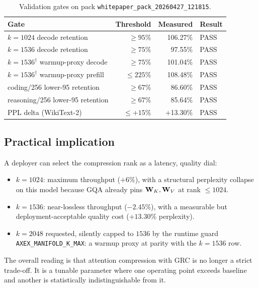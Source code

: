 \documentclass[11pt]{article}
\begin{document}
\begin{table}[h]\centering\footnotesize
\caption{Validation gates on pack \texttt{whitepaper\_pack\_20260427\_121815}.}
\begin{tabular}{@{}lrrl@{}}
\toprule
Gate & Threshold & Measured & Result\\
\midrule
$k{=}1024$ decode retention             & $\geq 95\%$ & 106.27\% & PASS\\
$k{=}1536$ decode retention             & $\geq 75\%$ &  97.55\% & PASS\\
$k{=}1536^\dagger$ warmup-proxy decode  & $\geq 75\%$ & 101.04\% & PASS\\
$k{=}1536^\dagger$ warmup-proxy prefill & $\leq 225\%$& 108.48\% & PASS\\
coding/256 lower-95 retention           & $\geq 67\%$ &  86.60\% & PASS\\
reasoning/256 lower-95 retention        & $\geq 67\%$ &  85.64\% & PASS\\
PPL delta (WikiText-2)                  & $\leq +15\%$&  +13.30\% & PASS\\
\bottomrule
\end{tabular}
\end{table}

\subsection{Practical implication}

A deployer can select the compression rank as a latency, quality dial:
\begin{itemize}
\item $k{=}1024$: maximum throughput ($+6\%$), with a structural
perplexity collapse on this model because GQA already pins
$\mathbf{W}_K,\mathbf{W}_V$ at rank $\leq 1024$.
\item $k{=}1536$: near-lossless throughput ($-2.45\%$), with a measurable
but deployment-acceptable quality cost ($+13.30\%$ perplexity).
\item $k{=}2048$ requested, silently capped to $1536$ by the runtime
guard \texttt{AXEX\_MANIFOLD\_K\_MAX}: a warmup proxy at parity with the
$k{=}1536$ row.
\end{itemize}
The overall reading is that attention compression with GRC is no longer a
strict trade-off. It is a tunable parameter where one operating point
exceeds baseline and another is statistically indistinguishable from it.

\clearpage
\printbibliography
\end{document}
